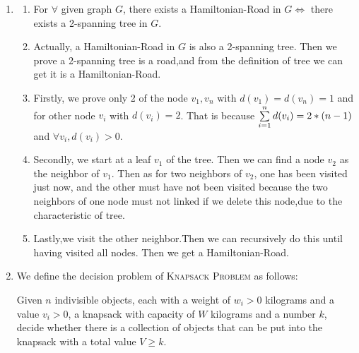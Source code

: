 \documentclass[12pt,a4paper]{article}
\makeatletter
\newtheorem*{solution}{Solution}
\theoremstyle{definition}
\renewenvironment{solution}[1][Solution] {\par\pushQED{\qed}\normalfont\topsep6\p@\@plus6\p@\relax\trivlist\item[\hskip\labelsep\bfseries#1\@addpunct{.}]\ignorespaces}{\popQED\endtrivlist\@endpefalse} \makeatother
\makeatother
\begin{document}
\begin{enumerate}
\begin{solution}
\begin{enumerate}
        \begin{enumerate}
            \item  For $\forall$ given graph $G$, there exists a Hamiltonian-Road in $G\Longleftrightarrow$ there exists a 2-spanning tree in $G$.
            \item         Actually, a Hamiltonian-Road in $G$ is also a 2-spanning tree. Then we prove a 2-spanning tree is a road,and from the definition of tree we can get it is a Hamiltonian-Road.
            \item  Firstly, we prove only 2 of the node $v_1,v_n$ with $d(v_1)=d(v_n)=1$ and for other node $v_i$ with $d(v_i)=2$. That is because $\sum_{i=1}^{n}\limits d(v_i)=2*(n-1)$ and $\forall v_i,d(v_i)>0$.
            \item Secondly, we start at a leaf $v_1$ of the tree. Then we can find a node $v_2$ as the neighbor of $v_1$. Then as for two neighbors of $v_2$, one has been visited just now, and the other must have not been visited because the two neighbors of one node must not linked if we delete this node,due to the characteristic of tree.
            \item Lastly,we visit the other neighbor.Then we can recursively do this until having visited all nodes. Then we get a Hamiltonian-Road.
        \end{enumerate}
    \end{enumerate}
    \end{solution}
    \item We define the decision problem of \textsc{Knapsack Problem} as follows:
    
        Given $n$ indivisible objects, each with a weight of $w_i>0$ kilograms and a value $v_i>0$, a knapsack with capacity of $W$ kilograms and a number $k$, decide whether there is a collection of objects that can be put into the knapsack with a total value $V\geqslant k$.
        

\end{enumerate}
\end{document}
